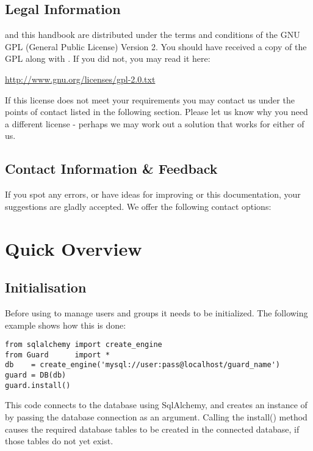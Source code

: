 \subsection{Legal Information}

\product and this handbook are distributed under the terms and conditions 
of the GNU GPL (General Public License) Version 2. You should have received 
a copy of the GPL along with \product. If you did not, you may read it here:

\vspace{1em}
\url{http://www.gnu.org/licenses/gpl-2.0.txt}
\vspace{1em}

If this license does not meet your requirements you may contact us under 
the points of contact listed in the following section. Please let us know 
why you need a different license - perhaps we may work out a solution 
that works for either of us.


\subsection{Contact Information \& Feedback}

If you spot any errors, or have ideas for improving \product or this 
documentation, your suggestions are gladly accepted.
We offer the following contact options: \\



\newpage
\section{Quick Overview}
\subsection{Initialisation}

Before using \product to manage users and groups it needs to be initialized. 
The following example shows how this is done:

\begin{lstlisting}
from sqlalchemy import create_engine
from Guard      import *
db    = create_engine('mysql://user:pass@localhost/guard_name')
guard = DB(db)
guard.install()
\end{lstlisting}

This code connects to the database using SqlAlchemy, and creates 
an instance of \product by passing the database connection as an argument. 
Calling the install() method causes the required database tables to be 
created in the connected database, if those tables do not yet exist.


